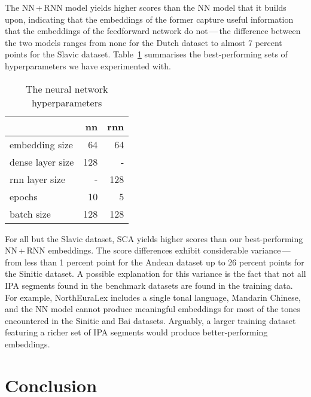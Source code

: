 \documentclass[a4paper]{report}
\begin{document}
The NN\,+\,RNN model yields higher scores than the NN model that it builds upon,
indicating that the embeddings of the former capture useful information that the embeddings of the feedforward network do not\,---\,the
difference between the two models ranges from none for the Dutch dataset to almost 7 percent points for the Slavic dataset.
Table~\ref{tab:networks} summarises the best-performing sets of hyperparameters we have experimented with.

\begin{table}[h]
	\centering\small
	\begin{tabular}{l *{2}{r}}
		\toprule
		& nn & rnn \\
		\midrule
		embedding size & 64 & 64 \\
		dense layer size & 128 & - \\
		rnn layer size & - & 128 \\
		epochs & 10 & 5 \\
		batch size & 128 & 128 \\
		\bottomrule
	\end{tabular}
	\caption{The neural network hyperparameters}
	\label{tab:networks}
\end{table}

For all but the Slavic dataset, SCA yields higher scores than our best-performing NN\,+\,RNN embeddings.
The score differences exhibit considerable variance\,---\,from less than 1 percent point for the Andean dataset up to 26 percent points for the Sinitic dataset.
A possible explanation for this variance is the fact that not all IPA segments found in the benchmark datasets are found in the training data.
For example, NorthEuraLex includes a single tonal language, Mandarin Chinese,
and the NN model cannot produce meaningful embeddings for most of the tones encountered in the Sinitic and Bai datasets.
Arguably, a larger training dataset featuring a richer set of IPA segments would produce better-performing embeddings.


\chapter{Conclusion}



\end{document}
